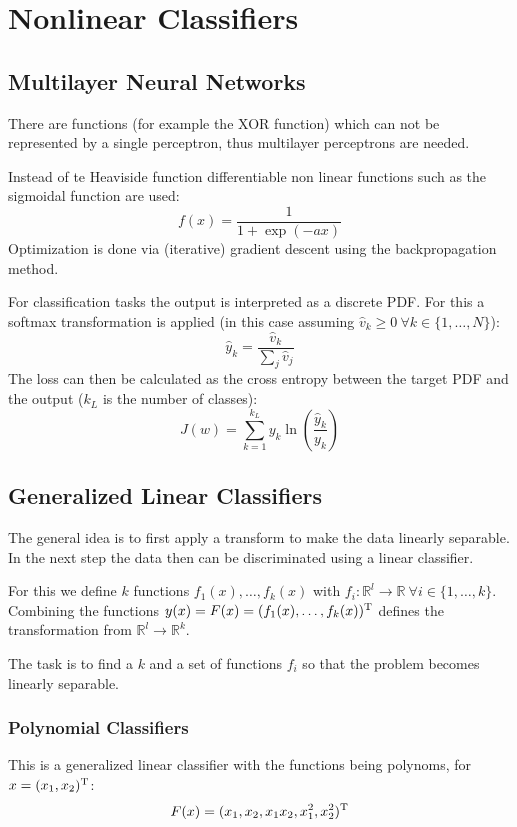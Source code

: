 \chapter{Nonlinear Classifiers}
\section{Multilayer Neural Networks}
There are functions (for example the XOR function) which can not be represented by a single perceptron, thus multilayer perceptrons are needed.

Instead of te Heaviside function differentiable non linear functions such as the sigmoidal function are used:
\begin{equation*}
    f(x) = \frac{1}{1 + \exp(-ax)}
\end{equation*}
Optimization is done via (iterative) gradient descent using the backpropagation method.

For classification tasks the output is interpreted as a discrete PDF. For this a softmax transformation is applied (in this case assuming $\hat{v}_k \geq 0\ \forall k \in \{1, \ldots, N\}$):
\begin{equation*}
    \hat{y}_k = \frac{\hat{v}_k}{\sum_j \hat{v}_j}
\end{equation*}
The loss can then be calculated as the cross entropy between the target PDF and the output ($k_L$ is the number of classes):
\begin{equation*}
    J(w) = \sum_{k=1}^{k_L} y_k \ln\left(\frac{\hat{y}_k}{y_k}\right)
\end{equation*}

\section{Generalized Linear Classifiers}
The general idea is to first apply a transform to make the data linearly separable. In the next step the data then can be discriminated using a linear classifier.

For this we define $k$ functions $f_1(x), \ldots, f_k(x)$ with $f_i: \mathbb{R}^l \to \mathbb{R}\ \forall i \in \{1, \ldots, k\}$. Combining the functions $y(x) = F(x) = (f_1(x), \ldots, f_k(x))^\text{T}$ defines the transformation from $\mathbb{R}^l \to \mathbb{R}^k$.

The task is to find a $k$ and a set of functions $f_i$ so that the problem becomes linearly separable.

\subsection{Polynomial Classifiers}
This is a generalized linear classifier with the functions being polynoms, for $x = (x_1, x_2)^\text{T}$:
\begin{equation*}
    F(x) = (x_1, x_2, x_1 x_2, x_1^2, x_2^2)^\text{T}
\end{equation*}

